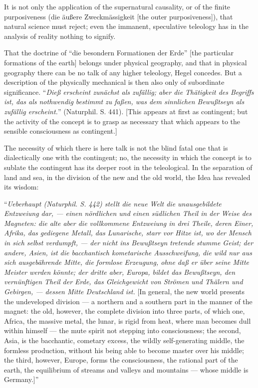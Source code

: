 \documentclass[12pt]{book}
\begin{document}
It is not only the application of the supernatural causality, or of the finite purposiveness (die äußere
Zweckmässigkeit [the outer purposiveness]), that natural science must reject; even the immanent, speculative
teleology has in the analysis of reality nothing to signify.

That the doctrine of ``die besondern Formationen der Erde'' [the particular formations of the earth] belongs
under physical geography, and that in physical geography there can be no talk of any higher teleology, Hegel
concedes. But a description of the physically mechanical is then also only of subordinate significance.
``\textit{Dieß erscheint zunächst als zufällig; aber die Thätigkeit des Begriffs ist, das als nothwendig
bestimmt}
\textit{zu faßen, was dem sinnlichen Bewußtseyn als zufällig erscheint.}'' (Naturphil. S. 441). [This
appears at first as contingent; but the activity of the concept is to grasp as necessary that which
appears to the sensible consciousness as contingent.]

The necessity of which there is here talk is not the blind fatal one that is dialectically one with the
contingent; no, the necessity in which the concept is to sublate the contingent has its deeper root in
the teleological. In the separation of land and sea, in the division of the new and the old world, the
Idea has revealed its wisdom:

``\textit{Ueberhaupt (Naturphil. S. 442) stellt die neue Welt die unausgebildete Entzweiung dar, ---
einen nördlichen und einen südlichen Theil in der Weise des Magneten: die alte aber die vollkommene
Entzweiung in drei Theile, deren Einer, Afrika, das gediegene Metall, das Lunarische, starr vor Hitze
ist, wo der Mensch in sich selbst verdumpft, --- der nicht ins Bewußtseyn tretende stumme Geist; der
andere, Asien, ist die bacchantisch kometarische Ausschweifung, die wild nur aus sich ausgebährende
Mitte, die formlose Erzeugung, ohne daß er über seine Mitte Meister werden könnte; der dritte aber,
Europa, bildet das Bewußtseyn, den vernünftigen Theil der Erde, das Gleichgewicht von Strömen und
Thälern und Gebirgen, --- dessen Mitte Deutschland ist.} [In general, the new world presents the
undeveloped division --- a northern and a southern part in the manner of the magnet: the old, however,
the complete division into three parts, of which one, Africa, the massive metal, the lunar, is rigid
from heat, where man becomes dull within himself --- the mute spirit not stepping into consciousness;
the second, Asia, is the bacchantic, cometary excess, the wildly self-generating middle, the formless
production, without his being able to become master over his middle; the third, however, Europe, forms
the consciousness, the rational part of the earth, the equilibrium of streams and valleys and
mountains --- whose middle is Germany.]''
\end{document}
